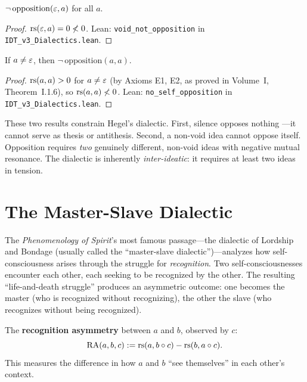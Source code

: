 \begin{theorem}
\label{thm:void-no-opposition}
$\neg\,\mathrm{opposition}(\varepsilon, a)$ for all $a$.
\end{theorem}

\begin{proof}
$\mathrm{rs}(\varepsilon, a) = 0 \not< 0$.
Lean: \texttt{void\_not\_opposition} in \texttt{IDT\_v3\_Dialectics.lean}.
\end{proof}

\begin{theorem}
\label{thm:no-self-opposition}
If $a \neq \varepsilon$, then $\neg\,\mathrm{opposition}(a, a)$.
\end{theorem}

\begin{proof}
$\mathrm{rs}(a, a) > 0$ for $a \neq \varepsilon$ (by Axioms E1, E2, as proved in
Volume~I, Theorem~I.1.6), so $\mathrm{rs}(a,a) \not< 0$.
Lean: \texttt{no\_self\_opposition} in \texttt{IDT\_v3\_Dialectics.lean}.
\end{proof}

\begin{interpretation}
These two results constrain Hegel's dialectic. First, silence opposes nothing
---it cannot serve as thesis or antithesis. Second, a non-void idea cannot
oppose itself. Opposition requires \emph{two} genuinely different, non-void
ideas with negative mutual resonance. The dialectic is inherently
\emph{inter-ideatic}: it requires at least two ideas in tension.
\end{interpretation}

\section{The Master-Slave Dialectic}

The \textit{Phenomenology of Spirit}'s most famous passage---the dialectic of
Lordship and Bondage (usually called the ``master-slave dialectic'')---analyzes
how self-consciousness arises through the struggle for \emph{recognition}.
Two self-consciousnesses encounter each other, each seeking to be recognized
by the other. The resulting ``life-and-death struggle'' produces an asymmetric
outcome: one becomes the master (who is recognized without recognizing), the
other the slave (who recognizes without being recognized).

\begin{definition}
\label{def:recognition-asymmetry}
The \textbf{recognition asymmetry} between $a$ and $b$, observed by $c$:
\[
\mathrm{RA}(a, b, c) := \mathrm{rs}(a, b \circ c) - \mathrm{rs}(b, a \circ c).
\]
This measures the difference in how $a$ and $b$ ``see themselves'' in each
other's context.
\end{definition}

